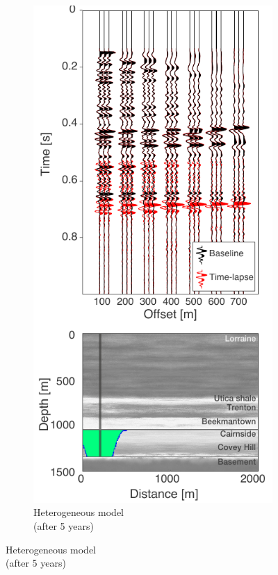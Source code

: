 \begin{figure}[!ht]
        \centering
        \begin{subfigure}[b]{.5\textwidth}
                \caption{Heterogeneous model \\ (after 5 years)}
                \includegraphics[width=\textwidth]{fig/stochvsblock_a.pdf}

\end{subfigure}
\end{figure}
